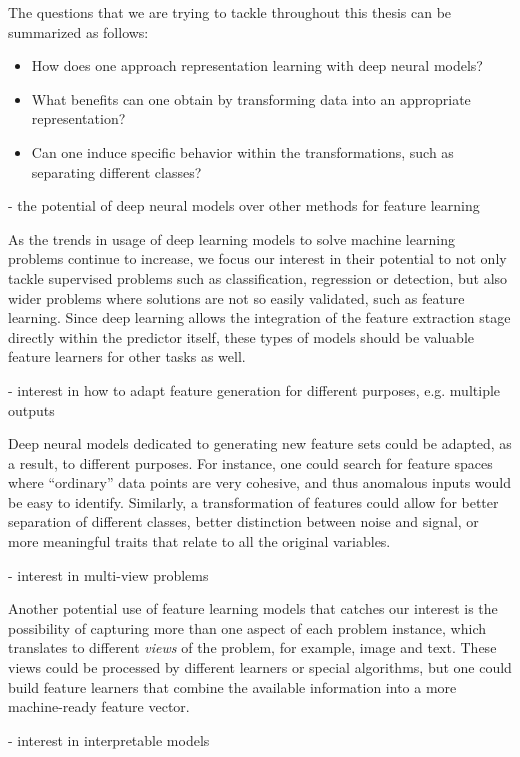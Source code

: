 The questions that we are trying to tackle throughout this thesis can be summarized as follows:

\begin{itemize}
    \item How does one approach representation learning with deep neural models?
    \item What benefits can one obtain by transforming data into an appropriate representation?
    \item Can one induce specific behavior within the transformations, such as separating different classes?
\end{itemize}


- the potential of deep neural models over other methods for feature learning

As the trends in usage of deep learning models to solve machine learning problems continue to increase, we focus our interest in their potential to not only tackle supervised problems such as classification, regression or detection, but also wider problems where solutions are not so easily validated, such as feature learning. Since deep learning allows the integration of the feature extraction stage directly within the predictor itself, these types of models should be valuable feature learners for other tasks as well.

- interest in how to adapt feature generation for different purposes, e.g. multiple outputs

Deep neural models dedicated to generating new feature sets could be adapted, as a result, to different purposes. For instance, one could search for feature spaces where ``ordinary'' data points are very cohesive, and thus anomalous inputs would be easy to identify. Similarly, a transformation of features could allow for better separation of different classes, better distinction between noise and signal, or more meaningful traits that relate to all the original variables.

- interest in multi-view problems

Another potential use of feature learning models that catches our interest is the possibility of capturing more than one aspect of each problem instance, which translates to different \textit{views} of the problem, for example, image and text. These views could be processed by different learners or special algorithms, but one could build feature learners that combine the available information into a more machine-ready feature vector.

- interest in interpretable models

